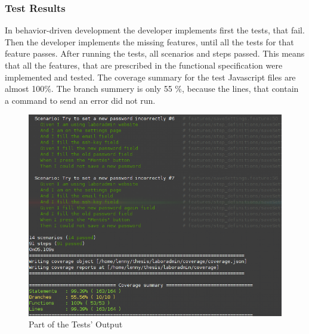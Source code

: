 \subsubsection{Test Results}
In behavior-driven development the developer implements first the tests, that fail. Then the developer implements the missing features, until all the tests for that feature passes. After running the tests, all scenarios and steps passed. This means that all the features, that are prescribed in the functional specification were implemented and tested. The coverage summary for the test Javascript files are almost 100\%. The branch summery is only 55 \%, because the lines, that contain a command to send an error did not run.

\begin{figure}[!ht]
	\includegraphics[width=\textwidth]{figures/test-result.png}
	\caption{Part of the Tests' Output}
	\label{fig:test-results}
	\end{figure}

